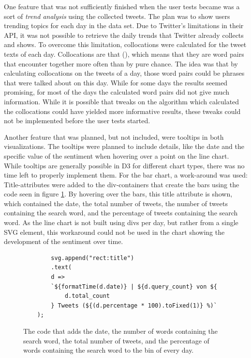 One feature that was not sufficiently finished when the user tests became was a sort of \emph{trend analysis} using the collected tweets. The plan was to show users trending topics for each day in the data set. Due to Twitter's limitations in their API, it was not possible to retrieve the daily trends that Twitter already collects and shows. 
To overcome this limitation, collocations were calculated for the tweet texts of each day. Collocations are  that  (\cite[2]{mckeown2000collocations}), which means that they are word pairs that encounter together more often than by pure chance. The idea was that by calculating collocations on the tweets of a day, those word pairs could be phrases that were talked about on this day. While for some days the results seemed promising, for most of the days the calculated word pairs did not give much information. While it is possible that tweaks on the algorithm which calculated the collocations could have yielded more informative results, these tweaks could not be implemented before the user tests started.

Another feature that was planned, but not included, were tooltips in both visualizations. The tooltips were planned to include details, like the date and the specific value of the sentiment when hovering over a point on the line chart. While tooltips are generally possible in D3 for different chart types, there was no time left to properly implement them. For the bar chart, a work-around was used: Title-attributes were added to the div-containers that create the bars using the code seen in figure \ref{code:details_title}. By hovering over the bars, this title attribute is shown, which contained the date, the total number of tweets, the number of tweets containing the search word, and the percentage of tweets containing the search word. As the line chart is not built using divs per day, but rather from a single SVG element, this workaround could not be used in the chart showing the development of the sentiment over time.

\begin{figure}[h!]
    \begin{verbatim}
        svg.append("rect:title")
        .text(
        d =>
        `${formatTime(d.date)} | ${d.query_count} von ${
            d.total_count
        } Tweets (${(d.percentage * 100).toFixed(1)} %)`
    );
    \end{verbatim}
    \caption{The code that adds the date, the number of words containing the search word, the total number of tweets, and the percentage of words containing the search word to the bin of every day.}
    \label{code:details_title}
\end{figure}

